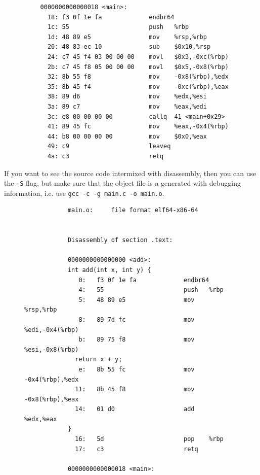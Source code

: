 \documentclass{article}
\begin{document}
\begin{theorem}
\begin{lstlisting}
          0000000000000018 <main>:
            18:	f3 0f 1e fa          	endbr64 
            1c:	55                   	push   %rbp
            1d:	48 89 e5             	mov    %rsp,%rbp
            20:	48 83 ec 10          	sub    $0x10,%rsp
            24:	c7 45 f4 03 00 00 00 	movl   $0x3,-0xc(%rbp)
            2b:	c7 45 f8 05 00 00 00 	movl   $0x5,-0x8(%rbp)
            32:	8b 55 f8             	mov    -0x8(%rbp),%edx
            35:	8b 45 f4             	mov    -0xc(%rbp),%eax
            38:	89 d6                	mov    %edx,%esi
            3a:	89 c7                	mov    %eax,%edi
            3c:	e8 00 00 00 00       	callq  41 <main+0x29>
            41:	89 45 fc             	mov    %eax,-0x4(%rbp)
            44:	b8 00 00 00 00       	mov    $0x0,%eax
            49:	c9                   	leaveq 
            4a:	c3                   	retq 
        \end{lstlisting}

        If you want to see the source code intermixed with disassembly, then you can use the \texttt{-S} flag, but make sure that the object file is a generated with debugging information, i.e. use \texttt{gcc -c -g main.c -o main.o}. 
        \begin{figure}[H]
          \centering 
          \begin{lstlisting}
            main.o:     file format elf64-x86-64


            Disassembly of section .text:

            0000000000000000 <add>:
            int add(int x, int y) {
               0:	f3 0f 1e fa          	endbr64 
               4:	55                   	push   %rbp
               5:	48 89 e5             	mov    %rsp,%rbp
               8:	89 7d fc             	mov    %edi,-0x4(%rbp)
               b:	89 75 f8             	mov    %esi,-0x8(%rbp)
              return x + y; 
               e:	8b 55 fc             	mov    -0x4(%rbp),%edx
              11:	8b 45 f8             	mov    -0x8(%rbp),%eax
              14:	01 d0                	add    %edx,%eax
            }
              16:	5d                   	pop    %rbp
              17:	c3                   	retq   

            0000000000000018 <main>:


\end{lstlisting}
\end{figure}
\end{theorem}
\end{document}
